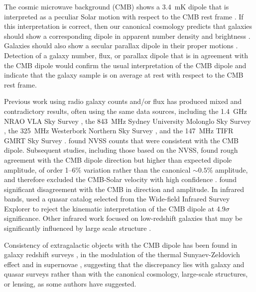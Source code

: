 \documentclass[twocolumn]{aastex63}
\begin{document}
The cosmic microwave background (CMB) shows a 3.4~mK dipole that is interpreted as a peculiar
Solar motion with respect to the CMB rest frame \citep{smoot1977}.
If this interpretation is correct, then our canonical cosmology
predicts that galaxies should show a corresponding dipole in apparent number density and brightness
\citep{ellis1984}.  Galaxies should also show a secular parallax dipole in their proper motions
\citep{ding2009, paine2020, croft2021}.
Detection of a galaxy number, flux, or parallax dipole that is in agreement with the CMB dipole would confirm the
usual interpretation of the
CMB dipole and indicate that the galaxy sample is on average at rest with respect to the CMB rest frame.

Previous work using radio galaxy counts and/or flux has produced mixed and contradictory results,
often using the same data sources, including the 1.4~GHz NRAO VLA Sky Survey \citep[NVSS;][]{condon1998},
the 843~MHz Sydney University Molonglo Sky Survey \citep[SUMSS;][]{murphy2007},  the 325~MHz
Westerbork Northern Sky Survey \citep[WENSS;][]{rengelink1997}, and the 147~MHz TIFR GMRT Sky Survey
\citep[TGSS-ADR1;][]{intema2017}.  \citet{blake2002} found NVSS counts that were consistent with the CMB dipole.
Subsequent studies, including those based on the NVSS, found rough agreement with the CMB dipole direction but
higher than expected dipole amplitude, of order 1--6\% variation rather than the canonical $\sim0.5$\% amplitude,
and therefore excluded the CMB-Solar velocity with high confidence \citep[e.g.,][]{singal2011,rubart2013,tiwari2019,siewert2021}.
\citet{gibelyou2012} found significant disagreement with the CMB in direction and amplitude.
In infrared bands, \citet{secrest2021} used a quasar catalog selected from the
Wide-field Infrared Survey Explorer \citep[WISE;][]{wright2010} to reject the kinematic interpretation of the CMB
dipole at 4.9$\sigma$ significance.  Other infrared work focused on low-redshift galaxies that may be significantly
influenced by large scale structure \citep[e.g.,][]{gibelyou2012}.

Consistency of extragalactic objects with the CMB dipole has been found in galaxy redshift surveys
\citep[e.g.,][]{rowan-robinson1990,lavaux2010},
  in the modulation of the thermal Sunyaev-Zeldovich effect \citep[tSZ;][]{akrami2020} and in supernovae \citep{horstmann2021},
suggesting that the discrepancy lies with galaxy and quasar surveys rather than with the canonical cosmology, large-scale structures, or lensing, as some authors have suggested.
\end{document}
